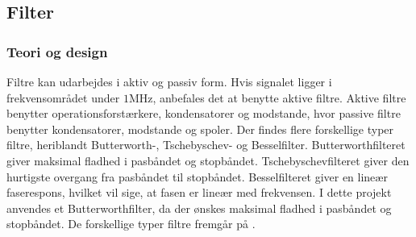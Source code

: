 \subsection{Filter}\label{Filter_afsnit}
\subsubsection{Teori og design}
Filtre kan udarbejdes i aktiv og passiv form. Hvis signalet ligger i frekvensområdet under $1$MHz, anbefales det at benytte aktive filtre. Aktive filtre benytter operationsforstærkere, kondensatorer og modstande, hvor passive filtre benytter kondensatorer, modstande og spoler. \cite{Carter2013} Der findes flere forskellige typer filtre, heriblandt Butterworth-, Tschebyschev- og Besselfilter. Butterworthfilteret giver maksimal fladhed i pasbåndet og stopbåndet. Tschebyschevfilteret giver den hurtigste overgang fra pasbåndet til stopbåndet. Besselfilteret giver en lineær faserespons, hvilket vil sige, at fasen er lineær med frekvensen. \cite{Carter2013} I dette projekt anvendes et Butterworthfilter, da der ønskes maksimal fladhed i pasbåndet og stopbåndet. De forskellige typer filtre fremgår på .
